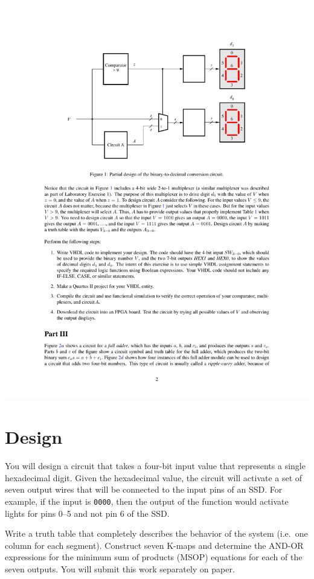 \documentclass[10pt]{article}
\begin{document}
\begin{center}
\includegraphics[scale=1.0]{sssd}
\end{center}

\section{Design}

You will design a circuit that takes a four-bit input value that
represents a single hexadecimal digit. Given the hexadecimal value,
the circuit will activate a set of seven output wires that will be
connected to the input pins of an SSD. For example, if the input is
{\tt 0000}, then the output of the function would activate lights
for pins 0--5 and not pin 6 of the SSD.

Write a truth table that completely describes the behavior of the
system (i.e.\ one column for each segment). Construct seven K-maps and
determine the AND-OR expressions for the minimum sum of products
(MSOP) equations for each of the seven outputs. You will submit this
work separately on paper.
\end{document}
